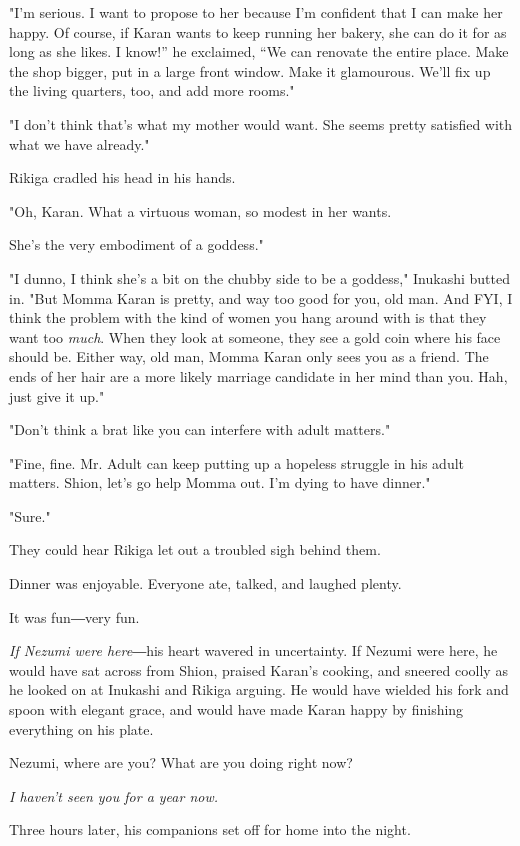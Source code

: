 "I'm serious. I want to propose to her because I'm confident that I can
make her happy. Of course, if Karan wants to keep running her bakery,
she can do it for as long as she likes. I know!'' he exclaimed, ``We can
renovate the entire place. Make the shop bigger, put in a large front
window. Make it glamourous. We'll fix up the living quarters, too, and
add more rooms."

"I don't think that's what my mother would want. She seems pretty
satisfied with what we have already."

Rikiga cradled his head in his hands.

"Oh, Karan. What a virtuous woman, so modest in her wants.~

She's the very embodiment of a goddess."

"I dunno, I think she's a bit on the chubby side to be a goddess,"
Inukashi butted in. "But Momma Karan is pretty, and way too good for
you, old man. And FYI, I think the problem with the kind of women you
hang around with is that they want too \emph{much}. When they look at someone,
they see a gold coin where his face should be. Either way, old man,
Momma Karan only sees you as a friend. The ends of her hair are a more
likely marriage candidate in her mind than you. Hah, just give it up."

"Don't think a brat like you can interfere with adult matters."

"Fine, fine. Mr. Adult can keep putting up a hopeless struggle in his
adult matters. Shion, let's go help Momma out. I'm dying to have
dinner."

"Sure."

They could hear Rikiga let out a troubled sigh behind them.

Dinner was enjoyable. Everyone ate, talked, and laughed plenty.

It was fun―very fun.

\emph{If Nezumi were here}―his heart wavered in uncertainty. If Nezumi were
here, he would have sat across from Shion, praised Karan's cooking, and
sneered coolly as he looked on at Inukashi and Rikiga arguing. He would
have wielded his fork and spoon with elegant grace, and would have made
Karan happy by finishing everything on his plate.

Nezumi, where are you? What are you doing right now?

\emph{I haven't seen you for a year now.}

Three hours later, his companions set off for home into the night.~

